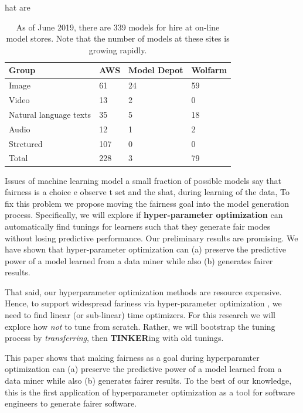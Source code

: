 \documentclass{NSF}
\newcommand{\IT}{{\bf {\sffamily TINKER}}}
\newcommand{\IT}{{\bf {\sffamily TINKER}}}
\begin{document}
\begin{nsfdescription}
hat are 
\begin{table} 
\begin{tabular}{p{1.5in}p{0.5in}p{0.5in}p{0.5in}} \hline
\rowcolor{blue!10}Group & AWS & Model Depot & Wolfarm \\ \hline
Image & 61 & 24 & 59 \\ \hline
\rowcolor{blue!10}Video & 13 & 2 & 0 \\ \hline
Natural language texts & 35 & 5 & 18 \\ \hline
\rowcolor{blue!10}Audio & 12 & 1 & 2 \\ \hline
Strctured & 107 & 0 & 0 \\ \hline
\rowcolor{blue!10}Total & 228 & 3 & 79 \\ \hline
\end{tabular}
  \caption{As of June 2019, there are 339 models
  for hire at on-line model stores.
   Note
  that the number of models at these sites is growing rapidly.}
  \label{tbl:stats}
  \end{table}
Issues of machine learning model 
a small fraction of   possible models say that {\e fairness is a choice}
e observe t set and the shat, during learning of the data,  To fix this problem we propose moving the fairness goal into the model generation process. Specifically, we will explore if 
  {\bf  hyper-parameter optimization} can automatically find tunings for learners such that they generate fair modes without losing predictive performance. Our preliminary results are promising. We have shown that  hyper-parameter optimization can (a) preserve the predictive power of a model learned from a data miner while also (b) generates fairer results. 
  
  That said, our
  hyperparameter optimization methods are resource expensive. Hence, to support    widespread fariness via hyper-parameter optimization , we need to find linear (or sub-linear) time optimizers. 
  For this research we will explore how   {\em not} to tune from scratch.
  Rather, we will bootstrap the  tuning
  process by  {\em transferring}, then {\IT}ing with  old tunings.
  
This paper shows that making fairness as a goal during hyperparamter optimization can (a) preserve the predictive power of a model learned from a data miner while also (b) generates fairer results. To the best of our knowledge, this is the first application of hyperparameter optimization as a tool for software engineers to generate fairer software.



\end{nsfdescription}
\end{document}
